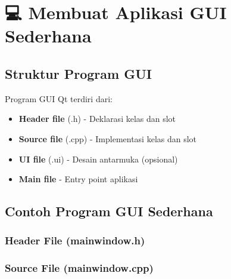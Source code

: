 

\section{💻 Membuat Aplikasi GUI Sederhana}

\subsection{Struktur Program GUI}

Program GUI Qt terdiri dari:
\begin{itemize}
\item \textbf{Header file} (.h) - Deklarasi kelas dan slot
\item \textbf{Source file} (.cpp) - Implementasi kelas dan slot
\item \textbf{UI file} (.ui) - Desain antarmuka (opsional)
\item \textbf{Main file} - Entry point aplikasi
\end{itemize}

\subsection{Contoh Program GUI Sederhana}

\subsubsection{Header File (mainwindow.h)}



\subsubsection{Source File (mainwindow.cpp)}

